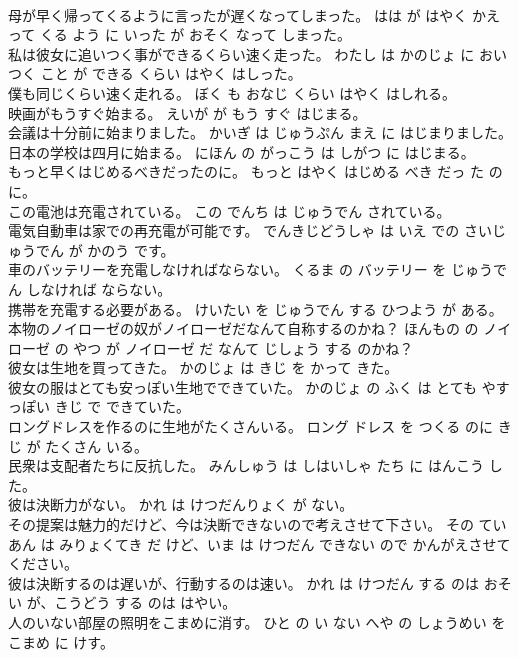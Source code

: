\documentclass[8pt]{extreport}
\begin{document}
\begin{CJK}{UTF8}{min}
\\	母が早く帰ってくるように言ったが遅くなってしまった。	はは が はやく かえって くる よう に いった が おそく なって しまった。	
\\	私は彼女に追いつく事ができるくらい速く走った。	わたし は かのじょ に おいつく こと が できる くらい はやく はしった。	
\\	僕も同じくらい速く走れる。	ぼく も おなじ くらい はやく はしれる。	
\\	映画がもうすぐ始まる。	えいが が もう すぐ はじまる。	
\\	会議は十分前に始まりました。	かいぎ は じゅうぷん まえ に はじまりました。	
\\	日本の学校は四月に始まる。	にほん の がっこう は しがつ に はじまる。	
\\	もっと早くはじめるべきだったのに。	もっと はやく はじめる べき だっ た のに。	
\\	この電池は充電されている。	この でんち は じゅうでん されている。	
\\	電気自動車は家での再充電が可能です。	でんきじどうしゃ は いえ での さいじゅうでん が かのう です。	
\\	車のバッテリーを充電しなければならない。	くるま の バッテリー を じゅうでん しなければ ならない。	
\\	携帯を充電する必要がある。	けいたい を じゅうでん する ひつよう が ある。	
\\	本物のノイローゼの奴がノイローゼだなんて自称するのかね？	ほんもの の ノイローゼ の やつ が ノイローゼ だ なんて じしょう する のかね？	
\\	彼女は生地を買ってきた。	かのじょ は きじ を かって きた。	
\\	彼女の服はとても安っぽい生地でできていた。	かのじょ の ふく は とても やすっぽい きじ で できていた。	
\\	ロングドレスを作るのに生地がたくさんいる。	ロング ドレス を つくる のに きじ が たくさん いる。	
\\	民衆は支配者たちに反抗した。	みんしゅう は しはいしゃ たち に はんこう した。	
\\	彼は決断力がない。	かれ は けつだんりょく が ない。	
\\	その提案は魅力的だけど、今は決断できないので考えさせて下さい。	その ていあん は みりょくてき だ けど、いま は けつだん できない ので かんがえさせて ください。	
\\	彼は決断するのは遅いが、行動するのは速い。	かれ は けつだん する のは おそい が、こうどう する のは はやい。	
\\	人のいない部屋の照明をこまめに消す。	ひと の い ない へや の しょうめい を こまめ に けす。	

\end{CJK}
\end{document}
